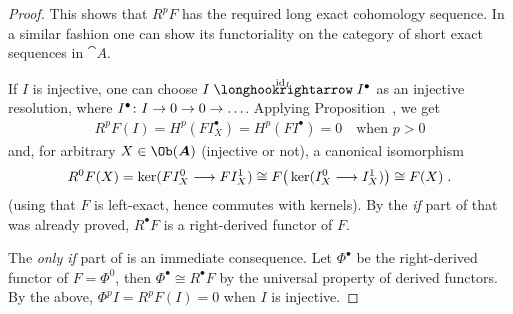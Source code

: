 \documentclass[a4paper,parskip=half,numbers=enddot, DIV=12]{scrreprt}
\begin{document}
\begin{proof}
		This shows that $R^pF$ has the required long exact cohomology sequence. In a similar fashion one can show its functoriality on the category of short exact sequences in ${\cat A}$.
		
		If $I$ is injective, one can choose $I\monomorphism[\id_I]I^\bullet $ as an injective resolution, where $I^\bullet \colon I\morphism 0\morphism 0\morphism\ldots$. Applying Proposition~, we get 
		\begin{align*}
			R^pF(I)=H^p(FI_X^\bullet )=H^p(FI^\bullet )=0\quad\text{when }p>0
		\end{align*}
		and, for arbitrary $X\in\Ob({\cat A})$ (injective or not), a canonical isomorphism
		\begin{align*}
			R^0F(X)=\ker(FI_X^0\morphism FI_X^1)\cong F\big(\ker(I_X^0\morphism I_X^1)\big)\cong F(X)\;.
		\end{align*}
		(using that $F$ is left-exact, hence commutes with kernels). By the \emph{if} part of  that was already proved, $R^\bullet F$ is a right-derived functor of $F$.
		
		The \emph{only if} part of  is an immediate consequence. Let $\Phi^\bullet $ be the right-derived functor of $F=\Phi^0$, then $\Phi^\bullet \cong R^\bullet F$ by the universal property of derived functors. By the above, $\Phi^pI=R^pF(I)=0$ when $I$ is injective.
		

\end{proof}
\end{document}

